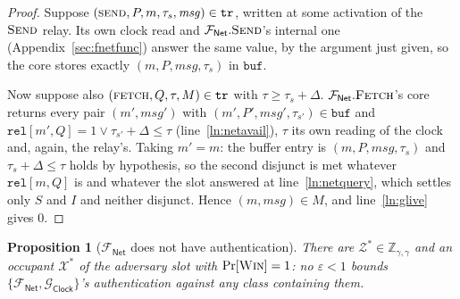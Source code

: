\documentclass[11pt,a4paper]{article}
\newcommand{\Zenv}{\mathcal{Z}}
\newcommand{\ZenvSet}{\mathbb{Z}}
\newcommand{\op}[1]{\textsc{#1}}
\newcommand{\Win}{\op{Win}}
\newcommand{\Gclock}{\mathcal{G}_{\mathsf{Clock}}}
\newcommand{\Fnet}{\mathcal{F}_{\mathsf{Net}}}
\newcommand{\msg}{\mathit{msg}}
\newcommand{\V}[1]{\mathtt{#1}}
\theoremstyle{accentdef}
\theoremstyle{accentplain}
\newtheorem{proposition}[definition]{Proposition}
\begin{document}
\begin{proof}
Suppose $(\op{send},P,m,\tau_s,\msg) \in \V{tr}$, written at some activation of the $\op{Send}$
relay. Its own clock read and $\Fnet.\op{Send}$'s internal one (Appendix~\ref{sec:fnetfunc})
answer the same value, by the argument just given, so the core stores exactly $(m,P,\msg,\tau_s)$
in $\V{buf}$.

Now suppose also $(\op{fetch},Q,\tau,M) \in \V{tr}$ with $\tau \geq \tau_s + \Delta$.
$\Fnet.\op{Fetch}$'s core returns every pair $(m',\msg')$ with $(m',P',\msg',\tau_{s'}) \in \V{buf}$
and $\V{rel}[m',Q] = 1 \vee \tau_{s'} + \Delta \leq \tau$ (line~\ref{ln:netavail}), $\tau$ its own
reading of the clock and, again, the relay's. Taking $m' = m$: the buffer entry is
$(m,P,\msg,\tau_s)$ and $\tau_s + \Delta \leq \tau$ holds by hypothesis, so the second disjunct is
met whatever $\V{rel}[m,Q]$ is and whatever the slot answered at line~\ref{ln:netquery}, which
settles only $S$ and $I$ and neither disjunct. Hence $(m,\msg) \in M$, and line~\ref{ln:glive}
gives $0$.
\end{proof}

\begin{proposition}[$\Fnet$ does not have authentication]\label{prop:netauth}
There are $\Zenv^{*} \in \ZenvSet_{\gamma,\gamma}$ and an occupant $\mathcal{X}^{*}$ of the
adversary slot with $\Pr[\Win] = 1$: no $\varepsilon < 1$ bounds $\{\Fnet,\Gclock\}$'s
authentication against any class containing them.
\end{proposition}
\end{document}
